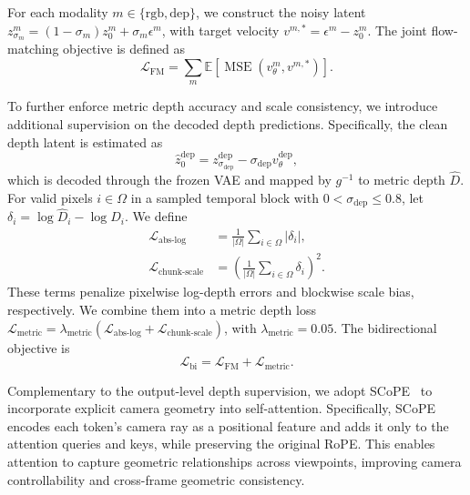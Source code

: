 For each modality $m\in\{\mathrm{rgb},\mathrm{dep}\}$, we construct the noisy latent $z_{\sigma_m}^{m}=(1-\sigma_m)z_0^{m}+\sigma_m\epsilon^{m}$, with target velocity $v^{m,*}=\epsilon^{m}-z_0^{m}$.
%
The joint flow-matching objective is defined as
\begin{equation}
\mathcal{L}_{\mathrm{FM}}
=\sum_m\mathbb{E}\!\left[
\operatorname{MSE}(v_\theta^m,v^{m,*})
\right].
\label{eq:joint_flow_matching}
\end{equation}


To further enforce metric depth accuracy and scale consistency, we introduce additional supervision on the decoded depth predictions.
%
Specifically, the clean depth latent is estimated as
\begin{equation}
\widehat z_0^{\mathrm{dep}}
=z_{\sigma_{\mathrm{dep}}}^{\mathrm{dep}}
-\sigma_{\mathrm{dep}}v_{\theta}^{\mathrm{dep}},
\label{eq:clean_depth_estimate}
\end{equation}
which is decoded through the frozen VAE and mapped by $g^{-1}$ to metric depth $\widehat D$.
%
For valid pixels $i\in\Omega$ in a sampled temporal block with $0<\sigma_{\mathrm{dep}}\leq0.8$, let $\delta_i=\log\widehat D_i-\log D_i$.
%
We define
\begin{equation}
\begin{aligned}
\mathcal{L}_{\mathrm{abs\text{-}log}}
&=\frac{1}{|\Omega|}\sum_{i\in\Omega}|\delta_i|,\\
\mathcal{L}_{\mathrm{chunk\text{-}scale}}
&=\left(\frac{1}{|\Omega|}\sum_{i\in\Omega}\delta_i\right)^2.
\end{aligned}
\label{eq:decoded_depth_losses}
\end{equation}
These terms penalize pixelwise log-depth errors and blockwise scale bias, respectively.
%
We combine them into a metric depth loss $\mathcal{L}_{\mathrm{metric}}=\lambda_{\mathrm{metric}}(\mathcal{L}_{\mathrm{abs\text{-}log}}+\mathcal{L}_{\mathrm{chunk\text{-}scale}})$, with $\lambda_{\mathrm{metric}}=0.05$.
%
The bidirectional objective is
\begin{equation}
\mathcal{L}_{\mathrm{bi}}=\mathcal{L}_{\mathrm{FM}}+\mathcal{L}_{\mathrm{metric}}.
\label{eq:bidirectional_objective}
\end{equation}

Complementary to the output-level depth supervision, we adopt SCoPE~\cite{yin2026scope} to incorporate explicit camera geometry into self-attention.
%
Specifically, SCoPE encodes each token's camera ray as a positional feature and adds it only to the attention queries and keys, while preserving the original RoPE.
%
This enables attention to capture geometric relationships across viewpoints, improving camera controllability and cross-frame geometric consistency.


